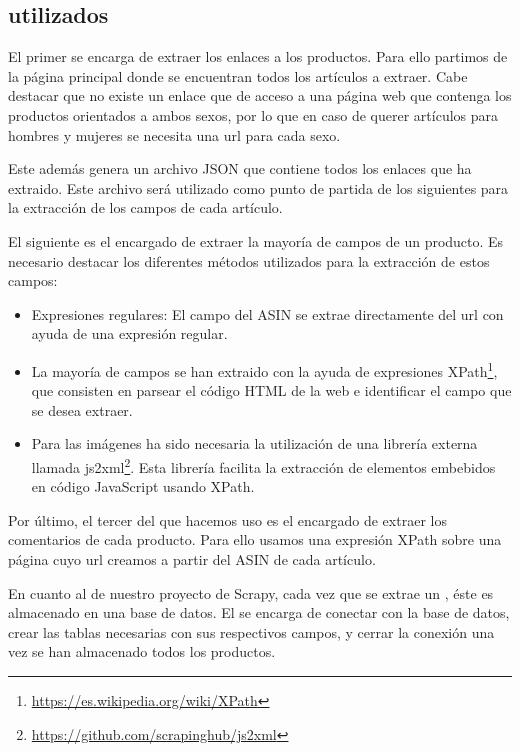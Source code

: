 \subsection{ utilizados}
El primer  se encarga de extraer los enlaces a los productos. Para ello partimos de la página principal donde se encuentran todos los artículos a extraer. Cabe destacar que no existe un enlace que de acceso a una página web que contenga los productos orientados a ambos sexos, por lo que en caso de querer artículos para hombres y mujeres se necesita una url para cada sexo.

Este  además genera un archivo JSON que contiene todos los enlaces que ha extraido. Este archivo será utilizado como punto de partida de los siguientes  para la extracción de los campos de cada artículo.


El siguiente  es el encargado de extraer la mayoría de campos de un producto. Es necesario destacar los diferentes métodos utilizados para la extracción de estos campos:

\begin{itemize}
    \item Expresiones regulares: El campo del ASIN se extrae directamente del url con ayuda de una expresión regular.
    \item La mayoría de campos se han extraido con la ayuda de expresiones XPath\footnote{\url{https://es.wikipedia.org/wiki/XPath}}, que consisten en parsear el código HTML de la web e identificar el campo que se desea extraer.
    \item Para las imágenes ha sido necesaria la utilización de una librería externa llamada js2xml\footnote{\url{https://github.com/scrapinghub/js2xml}}. Esta librería facilita la extracción de elementos embebidos en código JavaScript usando XPath.
\end{itemize}


Por último, el tercer  del que hacemos uso es el encargado de extraer los comentarios de cada producto. Para ello usamos una expresión XPath sobre una página cuyo url creamos a partir del ASIN de cada artículo.


En cuanto al  de nuestro proyecto de Scrapy, cada vez que se extrae un , éste es almacenado en una base de datos. El  se encarga de conectar con la base de datos, crear las tablas necesarias con sus respectivos campos, y cerrar la conexión una vez se han almacenado todos los productos.

